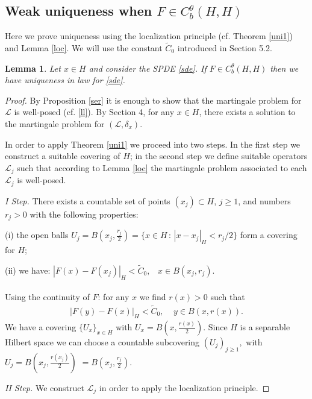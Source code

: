 \documentclass[preprint]{imsart}
\newtheorem{lemma}[theorem]{Lemma}
\def\L{\mathcal L}
\begin{document}
 

\subsection {Weak uniqueness when  $F \in C_b^{\theta}(H,H)$ } 
 
 Here we prove uniqueness using the localization principle (cf. Theorem \ref{uni1})  and  Lemma \ref{loc}.  We will use  the constant ${\tilde C_0}$ introduced in Section 5.2. 
   \begin{lemma}\label{loc1}   Let $x \in H$ and consider the  SPDE \eqref{sde}. 
   If $F \in C_b^{\theta}(H,H)$
  then we have uniqueness in law for \eqref{sde}.
\end{lemma} 
\begin{proof}  By Proposition \ref{ser} it is enough to show that 
 the martingale problem for $\L$  is well-posed (cf. \eqref{ll}).  
 By  Section 4,  for any $x \in H$, there exists a solution to the martingale problem for $(\L, \delta_x)$.
 
 
 In order to apply Theorem \ref{uni1}  we proceed into  two  steps.
In the first step we construct a suitable covering of $H$;  in the second step we define  suitable operators ${\L}_j$ such that  according to  Lemma \ref{loc}
 the martingale problem associated to each ${\L}_j$ is well-posed.     

 \smallskip
\noindent
{\it I Step.} There exists
     a  countable set of points $(x_j) \subset H$,
$j \ge 1$, and numbers $r_j >0$   with the following properties:

\smallskip
(i) the open balls $U_j= B(x_j, \frac{ r_j}{2})= \{ x \in H \, :\, |x- x_j|_H < r_j/2 \}$ 
  form a covering for $H$;

(ii)   we have:
$ 
| F(x) - F(x_j) |_H < {\tilde  C_0}, \;\;\;  x \in B(x_j, r_j).
$
\\
\\ 
Using   the continuity of $F$: for any $x$ we  find $r(x)>0$ such that 
$$
 \begin{array}{l}
|F(y) - F(x)|_H < {\tilde  C_0}, \;\;\;\;  y \in B(x, r(x)).
 \end{array}
 $$   
 We have a covering  $\{ U_{x}\}_{x \in H}$ with $U_x = B(x, \frac{r(x)}{2})$.
Since $H$ is a separable Hilbert space we can choose a countable subcovering $(U_j)_{j \ge 1}, $ with $U_j = B(x_j, \frac{r(x_j)}{2})$ $= B(x_j, \frac{r_j}{2})$.

\smallskip
\noindent
\textit{II Step.} We construct $\L_j$ in order to apply the localization principle.
  

\end{proof}
\end{document}
